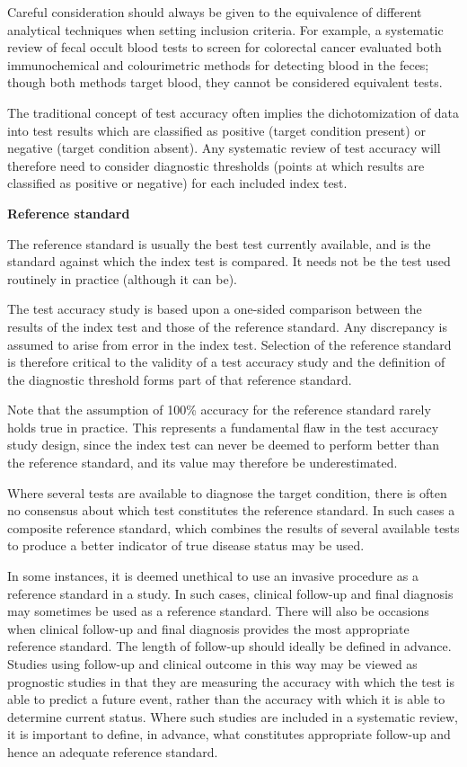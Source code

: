 \documentclass[
  10pt,
  a4paper,
  DIV=11,
  numbers=noendperiod]{scrreprt}
\begin{document}
Careful consideration should always be given to the equivalence of
different analytical techniques when setting inclusion criteria. For
example, a systematic review of fecal occult blood tests to screen for
colorectal cancer evaluated both immunochemical and colourimetric
methods for detecting blood in the feces; though both methods target
blood, they cannot be considered equivalent tests.

The traditional concept of test accuracy often implies the
dichotomization of data into test results which are classified as
positive (target condition present) or negative (target condition
absent). Any systematic review of test accuracy will therefore need to
consider diagnostic thresholds (points at which results are classified
as positive or negative) for each included index test.

\textbf{Reference standard}

The reference standard is usually the best test currently available, and
is the standard against which the index test is compared. It needs not
be the test used routinely in practice (although it can be).

The test accuracy study is based upon a one-sided comparison between the
results of the index test and those of the reference standard. Any
discrepancy is assumed to arise from error in the index test. Selection
of the reference standard is therefore critical to the validity of a
test accuracy study and the definition of the diagnostic threshold forms
part of that reference standard.

Note that the assumption of 100\% accuracy for the reference standard
rarely holds true in practice. This represents a fundamental flaw in the
test accuracy study design, since the index test can never be deemed to
perform better than the reference standard, and its value may therefore
be underestimated.

Where several tests are available to diagnose the target condition,
there is often no consensus about which test constitutes the reference
standard. In such cases a composite reference standard, which combines
the results of several available tests to produce a better indicator of
true disease status may be used.

In some instances, it is deemed unethical to use an invasive procedure
as a reference standard in a study. In such cases, clinical follow-up
and final diagnosis may sometimes be used as a reference standard. There
will also be occasions when clinical follow-up and final diagnosis
provides the most appropriate reference standard. The length of
follow-up should ideally be defined in advance. Studies using follow-up
and clinical outcome in this way may be viewed as prognostic studies in
that they are measuring the accuracy with which the test is able to
predict a future event, rather than the accuracy with which it is able
to determine current status. Where such studies are included in a
systematic review, it is important to define, in advance, what
constitutes appropriate follow-up and hence an adequate reference
standard.
\end{document}
